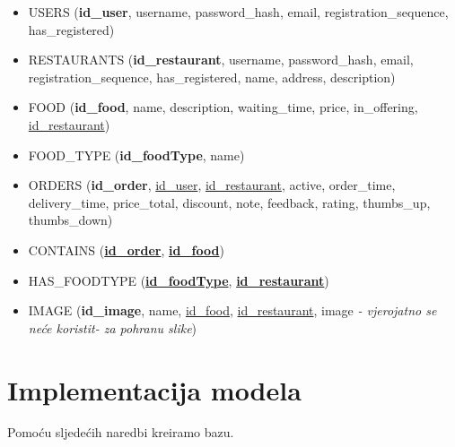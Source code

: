\documentclass[12pt]{scrartcl}
\begin{document}
\begin{itemize}
    \item[] \textsf{USERS (\textbf{id\_user}, username, password\_hash, email, registration\_sequence, \\has\_registered)}
    \item[] \textsf{RESTAURANTS (\textbf{id\_restaurant}, username, password\_hash, email, \\registration\_sequence, has\_registered, name, address, description)}
    \item[] \textsf{FOOD (\textbf{id\_food}, name, description, waiting\_time, price, in\_offering, \underline{id\_restaurant})}
    \item[] \textsf{FOOD\_TYPE (\textbf{id\_foodType}, name)}
    \item[] \textsf{ORDERS (\textbf{id\_order}, \underline{id\_user}, \underline{id\_restaurant}, active, order\_time, delivery\_time, price\_total, discount, note, feedback, rating, thumbs\_up, thumbs\_down)}
    \item[] \textsf{CONTAINS (\textbf{\underline{id\_order}}, \textbf{\underline{id\_food}})}
    \item[] \textsf{HAS\_FOODTYPE (\textbf{\underline{id\_foodType}}, \textbf{\underline{id\_restaurant}})}
    \item[] \textsf{IMAGE (\textbf{id\_image}, name, \underline{id\_food}, \underline{id\_restaurant}, image \emph{- vjerojatno se neće koristit- za pohranu slike})}

\end{itemize}

\pagebreak[3]

\section{Implementacija modela}

Pomoću sljedećih naredbi kreiramo bazu.
\end{document}
